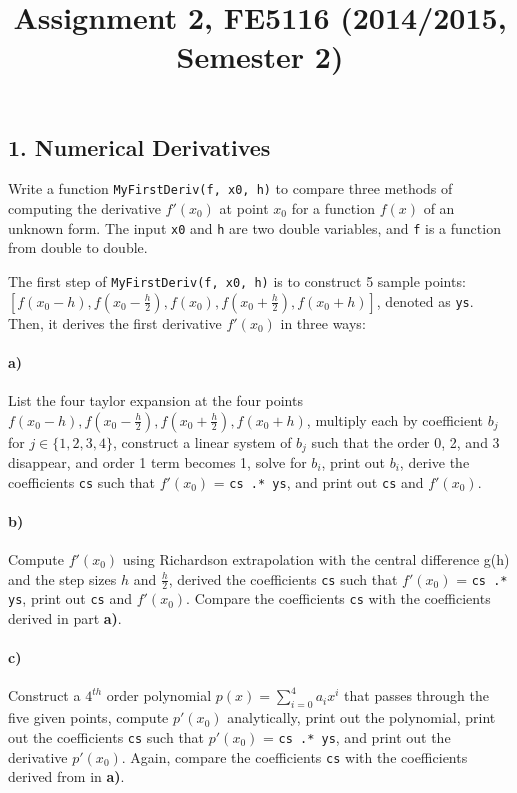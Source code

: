 \documentclass[12pt,a4paper,hidelinks,fleqn]{article}            %
\title{\vspace{-5ex}Assignment 2, FE5116 (2014/2015, Semester 2)\vspace{-7ex}}
\date{}
\begin{document}
\maketitle

\subsection*{1. Numerical Derivatives}
Write a function \verb=MyFirstDeriv(f, x0, h)= to compare three methods of computing the derivative $f'(x_0)$
at point $x_0$ for a function $f(x)$ of an unknown form.
The input \verb=x0= and \verb=h= are two double variables,
and \verb=f= is a function from double to double. 

The first step of \verb=MyFirstDeriv(f, x0, h)= is to construct 5 sample points: $[f(x_0-h), f(x_0-\frac{h}{2}), f(x_0), f(x_0+\frac{h}{2}), f(x_0+h)]$, denoted as \verb=ys=.
Then, it derives the first derivative $f'(x_0)$ in three ways:

\vspace{-6mm}
\paragraph{a)} List the four taylor expansion at the four points $f(x_0-h), f(x_0-\frac{h}{2}), f(x_0+\frac{h}{2}), f(x_0+h)$, 
multiply each by coefficient $b_j$ for $j\in\{1, 2, 3, 4\}$, 
construct a linear system of $b_j$ such that the order 0, 2, and 3 disappear, and order 1 term becomes 1, 
solve for $b_i$, 
print out $b_i$,
derive the coefficients \verb=cs= such that $f'(x_0)$ = \verb=cs .* ys=,
and print out \verb=cs= and $f'(x_0)$. 
\vspace{-6mm}
\paragraph{b)} Compute $f'(x_0)$ using Richardson extrapolation with the central difference g(h) and the step sizes $h$ and $\displaystyle \frac{h}{2}$,
derived the coefficients \verb=cs= such that $f'(x_0)$ = \verb=cs .* ys=,
print out \verb=cs= and $f'(x_0)$. Compare the coefficients \verb=cs= with the coefficients derived in part \textbf{a)}.
\vspace{-6mm}
\paragraph{c)} Construct a $4^{th}$ order polynomial $p(x) = \sum_{i=0}^4 a_i x^i$ that passes through the five given points, 
compute $p'(x_0)$ analytically, 
print out the polynomial,
print out the coefficients \verb=cs= such that $p'(x_0)$ = \verb=cs .* ys=,
and print out the derivative $p'(x_0)$.
Again, compare the coefficients \verb=cs= with the coefficients derived from in \textbf{a)}.
\end{document}
